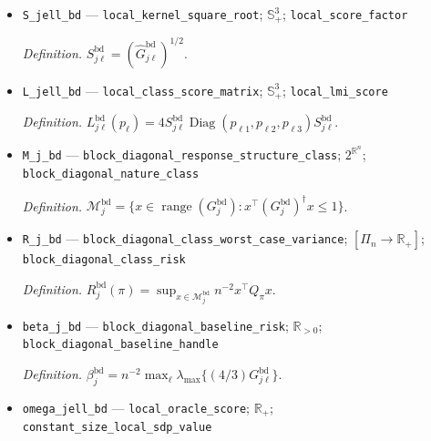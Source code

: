 \documentclass{article}
\begin{document}
\begin{itemize}
  \par\smallskip\noindent\emph{Definition.} \(\widehat G^{\mathrm{bd}}_{j\ell}=H^\top G^{\mathrm{bd}}_{j\ell}H\).
  \item \texttt{S\_\allowbreak{}jell\_\allowbreak{}bd} --- \texttt{local\_\allowbreak{}kernel\_\allowbreak{}square\_\allowbreak{}root}; \(\mathbb S_+^3\); \texttt{local\_\allowbreak{}score\_\allowbreak{}factor}
  \par\smallskip\noindent\emph{Definition.} \(S^{\mathrm{bd}}_{j\ell}=(\widehat G^{\mathrm{bd}}_{j\ell})^{1/2}\).
  \item \texttt{L\_\allowbreak{}jell\_\allowbreak{}bd} --- \texttt{local\_\allowbreak{}class\_\allowbreak{}score\_\allowbreak{}matrix}; \(\mathbb S_+^3\); \texttt{local\_\allowbreak{}lmi\_\allowbreak{}score}
  \par\smallskip\noindent\emph{Definition.} \(L^{\mathrm{bd}}_{j\ell}(p_\ell)=4S^{\mathrm{bd}}_{j\ell}\operatorname{Diag}(p_{\ell1},p_{\ell2},p_{\ell3})S^{\mathrm{bd}}_{j\ell}\).
  \item \texttt{M\_\allowbreak{}j\_\allowbreak{}bd} --- \texttt{block\_\allowbreak{}diagonal\_\allowbreak{}response\_\allowbreak{}structure\_\allowbreak{}class}; \(2^{\mathbb R^n}\); \texttt{block\_\allowbreak{}diagonal\_\allowbreak{}nature\_\allowbreak{}class}
  \par\smallskip\noindent\emph{Definition.} \(\mathcal M_j^{\mathrm{bd}}=\{x\in\operatorname{range}(G_j^{\mathrm{bd}}):x^\top(G_j^{\mathrm{bd}})^\dagger x\le1\}\).
  \item \texttt{R\_\allowbreak{}j\_\allowbreak{}bd} --- \texttt{block\_\allowbreak{}diagonal\_\allowbreak{}class\_\allowbreak{}worst\_\allowbreak{}case\_\allowbreak{}variance}; \([\Pi_n\to\mathbb R_+]\); \texttt{block\_\allowbreak{}diagonal\_\allowbreak{}class\_\allowbreak{}risk}
  \par\smallskip\noindent\emph{Definition.} \(R_j^{\mathrm{bd}}(\pi)=\sup_{x\in\mathcal M_j^{\mathrm{bd}}}n^{-2}x^\top Q_\pi x\).
  \item \texttt{beta\_\allowbreak{}j\_\allowbreak{}bd} --- \texttt{block\_\allowbreak{}diagonal\_\allowbreak{}baseline\_\allowbreak{}risk}; \(\mathbb R_{>0}\); \texttt{block\_\allowbreak{}diagonal\_\allowbreak{}baseline\_\allowbreak{}handle}
  \par\smallskip\noindent\emph{Definition.} \(\beta_j^{\mathrm{bd}}=n^{-2}\max_\ell\lambda_{\max}\{(4/3)G^{\mathrm{bd}}_{j\ell}\}\).
  \item \texttt{omega\_\allowbreak{}jell\_\allowbreak{}bd} --- \texttt{local\_\allowbreak{}oracle\_\allowbreak{}score}; \(\mathbb R_+\); \texttt{constant\_\allowbreak{}size\_\allowbreak{}local\_\allowbreak{}sdp\_\allowbreak{}value}

\end{itemize}
\end{document}
